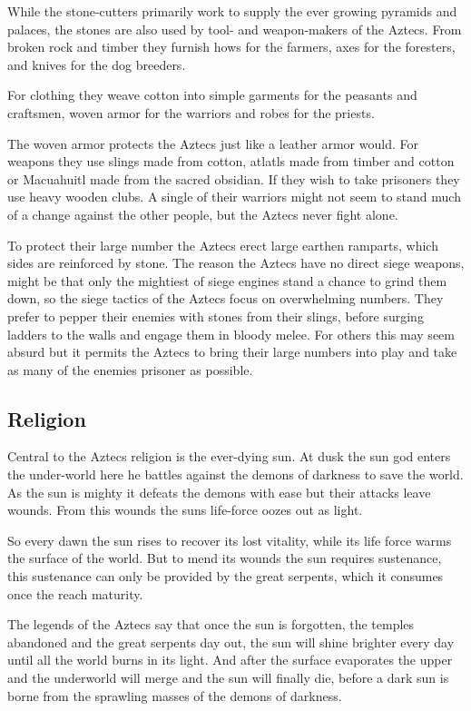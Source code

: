 \documentclass[a4paper]{book}
\begin{document}
	While the stone-cutters primarily work to supply the ever growing pyramids and palaces,
	the stones are also used by tool- and weapon-makers of the \gls{Aztecs}.
	From broken rock and timber they furnish hows for the farmers, axes for the foresters,
	and knives for the dog breeders.

	For clothing they weave cotton into simple garments for the peasants and craftsmen,
	woven armor for the warriors and robes for the priests.

	The woven armor protects the \gls{Aztecs} just like a leather armor would.
	For weapons they use slings made from cotton, atlatls made from timber and cotton
	or Macuahuitl made from the sacred obsidian.
	If they wish to take prisoners they use heavy wooden clubs.
	A single of their warriors might not seem to stand much of a change against the other people,
	but the \gls{Aztecs} never fight alone.

	To protect their large number the \gls{Aztecs} erect large earthen ramparts,
	which sides are reinforced by stone.
	The reason the \gls{Aztecs} have no direct siege weapons,
	might be that only the mightiest of siege engines stand a chance to grind them down,
	so the siege tactics of the \gls{Aztecs} focus on overwhelming numbers.
	They prefer to pepper their enemies with stones from their slings,
	before surging ladders to the walls and engage them in bloody melee.
	For others this may seem absurd but it permits the \gls{Aztecs} to bring their large
	numbers into play and take as many of the enemies prisoner as possible.

	\subsection{Religion}
		Central to the \gls{Aztecs} religion is the ever-dying sun.
		At dusk the sun god enters the under-world here he battles against
		the demons of darkness to save the world.
		As the sun is mighty it defeats the demons with ease but their attacks leave wounds.
		From this wounds the suns life-force oozes out as light.

		So every dawn the sun rises to recover its lost vitality,
		while its life force warms the surface of the world.
		But to mend its wounds the sun requires sustenance,
		this sustenance can only be provided by the great serpents,
		which it consumes once the reach maturity.

		The legends of the \gls{Aztecs} say that once the sun is forgotten,
		the temples abandoned and the great serpents day out,
		the sun will shine brighter every day until all the world burns in its light.
		And after the surface evaporates the upper and the underworld will merge
		and the sun will finally die,
		before a dark sun is borne from the sprawling masses of the demons of darkness.
\end{document}
